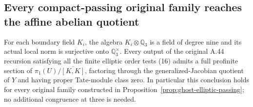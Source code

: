 \subsection{Every compact-passing original family reaches the affine abelian quotient}
\label{sec:ghost-boundary-local-norm}

\begin{proposition}
\label{prop:ghost-all-passing-genjac}
For each boundary field \(K_i\), the algebra
\(K_i\otimes\mathbb Q_3\) is a field of degree nine
and its actual local norm is surjective onto
\(\mathbb Q_3^\times\).
Every output of the original A.44 recursion satisfying
all the finite elliptic order tests (16) admits a full
profinite section of
\(\pi_1(U)/\overline{[K,K]}\), factoring through the
generalized-Jacobian quotient of \(Y\) and having proper
Tate-module class zero. In particular this conclusion
holds for every original family constructed in
Proposition~\ref{prop:ghost-elliptic-passing}; no
additional congruence at three is needed.
\end{proposition}
